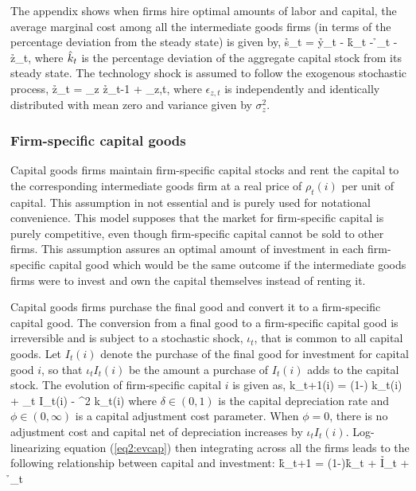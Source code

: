 The appendix shows when firms hire optimal amounts of labor and capital, the average marginal cost among all the intermediate goods firms (in terms of the percentage deviation from the steady state) is given by,
\beq \label{eq2:mc} \h{s}_t =  \h{y}_t -  \h{k}_t - \h{\lambda}_t -  \h{z}_t, \eeq
where $\hat{k}_t$ is the percentage deviation of the aggregate capital stock from its steady state.  The technology shock is assumed to follow the exogenous stochastic process,
\beq \label{eq2:zshock} \h{z}_t = \rho_z \h{z}_{t-1} + \epsilon_{z,t}, \eeq
where $\epsilon_{z,t}$ is independently and identically distributed with mean zero and variance given by $\sigma_z^2$.

\subsubsection{Firm-specific capital goods}
Capital goods firms maintain firm-specific capital stocks and rent the capital to the corresponding intermediate goods firm at a real price of $\rho_t(i)$ per unit of capital.  This assumption in not essential and is purely used for notational convenience.  This model supposes that the market for firm-specific capital is purely competitive, even though firm-specific capital cannot be sold to other firms.  This assumption assures an optimal amount of investment in each firm-specific capital good which would be the same outcome if the intermediate goods firms were to invest and own the capital themselves instead of renting it.

Capital goods firms purchase the final good and convert it to a firm-specific capital good.  The conversion from a final good to a firm-specific capital good is irreversible and is subject to a stochastic shock, $\iota_t$, that is common to all capital goods.  Let $I_t(i)$ denote the purchase of the final good for investment for capital good $i$, so that $\iota_t I_t(i)$ be the amount a purchase of $I_t(i)$ adds to the capital stock.  The evolution of firm-specific capital $i$ is given as,
\beq \label{eq2:evcap} k_{t+1}(i) = (1-\delta) k_t(i) + \iota_t I_t(i) -  ^2 k_t(i) \eeq
where $\delta \in (0,1)$ is the capital depreciation rate and $\phi \in (0,\infty)$ is a capital adjustment cost parameter.  When $\phi=0$, there is no adjustment cost and capital net of depreciation increases by $\iota_t I_t(i)$.  Log-linearizing equation (\ref{eq2:evcap}) then integrating across all the firms leads to the following relationship between capital and investment:
\beq \label{eq2:inv} \h{k}_{t+1} = (1-\delta)\h{k}_t + \delta \h{I}_t + \delta \h{\iota}_t \eeq

